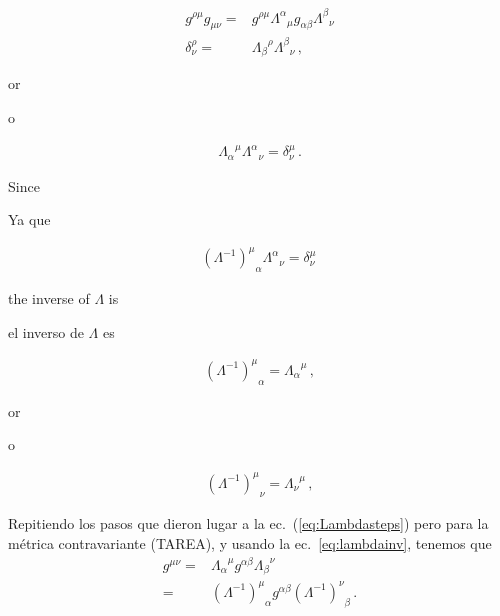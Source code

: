 \begin{frame}
\begin{align}
  g^{\rho\mu}g_{\mu\nu}=&g^{\rho\mu}{\Lambda^\alpha}_{\mu}g_{\alpha\beta}{\Lambda^\beta}_{\nu}\nonumber\\
  \delta^\rho_\nu=&{\Lambda_\beta}^\rho{\Lambda^\beta}_{\nu}\,,
\end{align}
\begin{english}
or  
\end{english}
\begin{spanish}
o
\end{spanish}
\begin{align}
  {\Lambda_\alpha}^\mu{\Lambda^\alpha}_{\nu}=\delta^\mu_\nu\,.
\end{align}
\begin{english}
Since
\end{english}
\begin{spanish}
Ya que
\end{spanish}
\begin{align}
  {\left(\Lambda^{-1}\right)^\mu}_\alpha{\Lambda^\alpha}_{\nu}=\delta^\mu_\nu\,
\end{align}
\begin{english}
the inverse of $\Lambda$ is
\end{english}
\begin{spanish}
el inverso de $\Lambda$ es
\end{spanish}
\begin{align}
  {\left(\Lambda^{-1}\right)^\mu}_\alpha={\Lambda_\alpha}^\mu\,,
\end{align}
\begin{english}
or  
\end{english}
\begin{spanish}
o
\end{spanish}
\begin{align}
\label{eq:lambdainv}
  {\left(\Lambda^{-1}\right)^\mu}_\nu={\Lambda_\nu}^\mu\,,
\end{align}

Repitiendo los pasos que dieron lugar a la ec.~(\ref{eq:Lambdasteps})
pero para la métrica contravariante (TAREA), y usando la
ec.~\eqref{eq:lambdainv}, tenemos que
\begin{align}
  \label{eq:Lambdacontra}
  g^{\mu\nu}=&{\Lambda_{\alpha}}^{\mu}g^{\alpha\beta}{\Lambda_{\beta}}^{\nu}\nonumber\\
           =&{\left( \Lambda^{-1} \right)^{\mu}}_{\alpha}g^{\alpha\beta} {\left( \Lambda^{-1} \right)^{\nu}}_{\beta}\,.
\end{align}

\end{frame}




